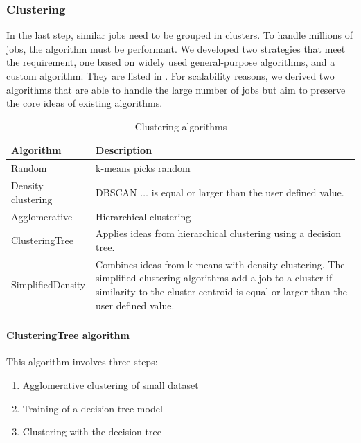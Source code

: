 \documentclass[]{llncs}
\begin{document}
\subsubsection{Clustering}
In the last step, similar jobs need to be grouped in clusters.
To handle millions of jobs, the algorithm must be performant.
We developed two strategies that meet the requirement, one based on widely used general-purpose algorithms, and a custom algorithm.
They are listed in .
For scalability reasons, we derived two algorithms that are able to handle the large number of jobs but aim to preserve the core ideas of existing algorithms.

\begin{table}
  \centering
	\begin{tabularx}{\textwidth}{lX}
    \hline
    Algorithm & Description \\
    \hline
    Random & k-means picks random \\
    \hline
    Density clustering &  DBSCAN $ \ldots $  is equal or larger than the user defined value. \\
    \hline
    Agglomerative &  Hierarchical clustering \\
    \hline
    ClusteringTree &  Applies ideas from hierarchical clustering using a decision tree. \\
    \hline
    SimplifiedDensity &  Combines ideas from k-means with density clustering. The simplified clustering algorithms add a job to a cluster if similarity to the cluster centroid is equal or larger than the user defined value. \\
    \hline
  \end{tabularx}
  \caption{Clustering algorithms}
  \label{tab:clustering_algorithms}
\end{table}


\paragraph{ClusteringTree algorithm}
This algorithm involves three steps:

\begin{enumerate}
 \item Agglomerative clustering of small dataset
 \item Training of a decision tree model
 \item Clustering with the decision tree
\end{enumerate}
\end{document}
